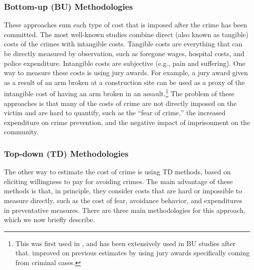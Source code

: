 \subsubsection{Bottom-up (BU) Methodologies}
\noindent These approaches sum each type of cost that is imposed after the crime has been committed. The most well-known studies combine direct (also known as tangible) costs of the crimes with intangible costs. Tangible costs are everything that can be directly measured by observation, such as foregone wages, hospital costs, and police expenditure. Intangible costs are subjective (e.g., pain and suffering). One way to measure these costs is using jury awards. For example, a jury award given as a result of an arm broken at a construction site can be used as a proxy of the intangible cost of having an arm broken in an assault.\footnote{This was first used in \citet{cohen_1988_Pain-Suffering}, and has been extensively used in BU studies after that. \citet{Miller_Cohen_ea_1996_BOOKvictim} improved on previous estimates by using jury awards specifically coming from criminal cases.} The problem of these approaches is that many of the costs of crime are not directly imposed on the victim and are hard to quantify, such as the ``fear of crime,'' the increased expenditure on crime prevention, and the negative impact of imprisonment on the community.

\subsubsection{Top-down (TD) Methodologies}
\noindent The other way to estimate the cost of crime is using TD methods, based on eliciting willingness to pay for avoiding crimes. The main advantage of these methods is that, in principle, they consider costs that are hard or impossible to measure directly, such as the cost of fear, avoidance behavior, and expenditures in preventative measures. There are three main methodologies for this approach, which we now briefly describe.

